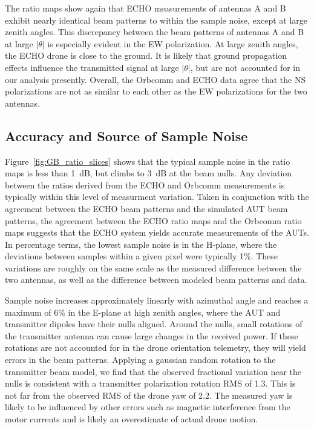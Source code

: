 \documentclass[preprint2,numberedappendix,tighten,twocolappendix]{aastex6}
\begin{document}
The ratio maps show again that ECHO measurements of antennas A and B exhibit nearly identical beam patterns to within the sample noise, except at large zenith angles.  This discrepancy between the beam patterns of antennas A and B at large $|\theta|$ is especially evident in the EW polarization. At large zenith angles, the ECHO drone is close to the ground.  It is likely that ground propagation effects influence the transmitted signal at large $|\theta|$, but are not accounted for in our analysis presently.    Overall, the Orbcomm and ECHO data agree that the NS polarizations are not as similar to each other as the EW polarizations for the two antennas.  


\subsection{Accuracy and Source of Sample Noise}

Figure~\ref{fig:GB_ratio_slices} shows that the typical sample noise in the ratio maps is less than 1~dB, but climbs to 3~dB at the beam nulls.  Any deviation between the ratios derived from the ECHO and Orbcomm measurements is typically within this level of measurment variation.  Taken in conjunction with the agreement between the ECHO beam patterns and the simulated AUT beam patterns, the agreement between the ECHO ratio maps and the Orbcomm ratio maps suggests that the ECHO system yields accurate measurements of the AUTs.  In percentage terms, the lowest sample noise is in the H-plane, where the deviations between samples within a given pixel were typically 1\%. These variations are roughly on the same scale as the measured difference between the two antennas, as well as the difference between modeled beam patterns and data.  

Sample noise increases approximately linearly with azimuthal angle and reaches a maximum of 6\% in the E-plane at high zenith angles, where the AUT and transmitter dipoles have their nulls aligned.  Around the nulls, small rotations of the transmitter antenna can cause large changes in the received power.  If these rotations are not accounted for in the drone orientation telemetry, they will yield errors in the beam patterns.  Applying a gaussian random rotation to the transmitter beam model, we find that the observed fractional variation near the nulls is consistent with a transmitter polarization  rotation RMS of 1.3\arcdeg{}.  This is not far from the observed RMS of the drone yaw of 2.2\arcdeg{}.  The measured yaw is likely to be influenced by other errors such as magnetic interference from the motor currents and is likely an overestimate of actual drone motion.
\end{document}
